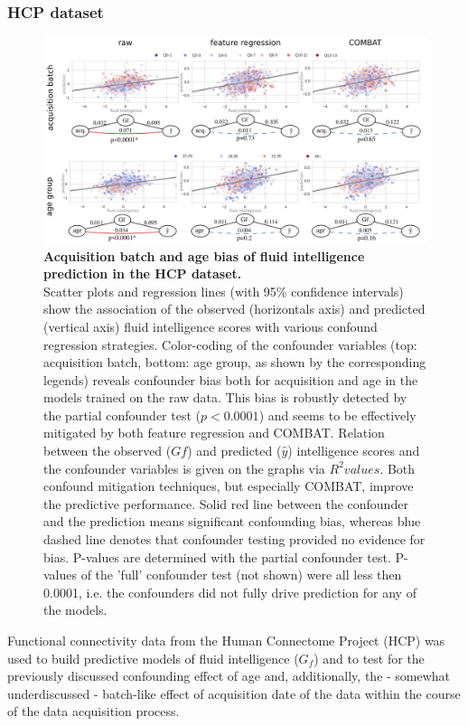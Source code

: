 \documentclass{article}
\begin{document}
\subsubsection*{HCP dataset}

\begin{figure}[!b]
  \centering
  \includegraphics[width=0.75\paperwidth]{fig/fig_hcp.png}
  \caption{\textbf{Acquisition batch and age bias of fluid intelligence prediction in the HCP dataset.} \\
  Scatter plots and regression lines (with 95\% confidence intervals) show the association of the observed (horizontals axis) and predicted (vertical axis) fluid intelligence scores with various confound regression strategies. Color-coding of the confounder variables (top: acquisition batch, bottom: age group, as shown by the corresponding legends) reveals confounder bias both for acquisition and age in the models trained on the raw data. This bias is robustly detected by the partial confounder test ($p<0.0001$) and seems to be effectively mitigated by both feature regression and COMBAT.
  Relation between the observed ($Gf$) and predicted ($\hat{y}$) intelligence scores and the confounder variables is given on the graphs via $R^2 values$. Both confound mitigation techniques, but especially COMBAT, improve the predictive performance.
  Solid red line between the confounder and the prediction means significant confounding bias, whereas blue dashed line denotes that confounder testing provided no evidence for bias. P-values are determined with the partial confounder test. P-values of the 'full' confounder test (not shown) were all less then 0.0001, i.e. the confounders did not fully drive prediction for any of the models.
  }
  \label{fig:hcp}
\end{figure}

Functional connectivity data from the Human Connectome Project\citep{van2013wu} (HCP) was used to build predictive models of fluid intelligence ($G_f$) and to test for the previously discussed confounding effect of age\citep{lohmann2021predicting, dubois2018distributed} and,  additionally, the - somewhat underdiscussed - batch-like effect of acquisition date of the data within the course of the data acquisition process.
\end{document}
